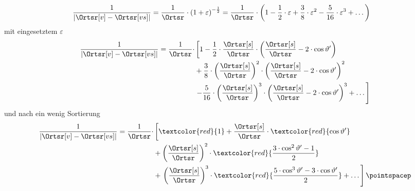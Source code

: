 \begin{frame}

  \begin{align*}
	\dfrac{1}{\left| \Ortsr[v] - \Ortsr[vs] \right|}
		&= \dfrac{1}{\Ortsr} \cdot \left( 1 + \varepsilon \right)^{-\frac{1}{2}} = \dfrac{1}{\Ortsr} \cdot \left( 1 - \dfrac{1}{2} \cdot \varepsilon + \dfrac{3}{8} \cdot \varepsilon^2 - \dfrac{5}{16} \cdot \varepsilon^3 + \dots \right)
\end{align*}
mit eingesetztem \(\varepsilon\)
\begin{equation*}
	\begin{split}
		\dfrac{1}{\left| \Ortsr[v] - \Ortsr[vs] \right|}
			= \dfrac{1}{\Ortsr} \cdot &\left[ 1
			- \dfrac{1}{2} \cdot \dfrac{\Ortsr[s]}{\Ortsr} \cdot \left( \dfrac{\Ortsr[s]}{\Ortsr} - 2 \cdot \cos \vartheta' \right) \right. \\
			&+ \dfrac{3}{8} \cdot \left( \dfrac{\Ortsr[s]}{\Ortsr} \right)^2 \cdot \left( \dfrac{\Ortsr[s]}{\Ortsr} - 2 \cdot \cos \vartheta' \right)^2 \\
			&\left. - \dfrac{5}{16} \cdot \left( \dfrac{\Ortsr[s]}{\Ortsr} \right)^3 \cdot \left( \dfrac{\Ortsr[s]}{\Ortsr} - 2 \cdot \cos \vartheta' \right)^3  + \dots \right]
	\end{split}
\end{equation*}
und nach ein wenig Sortierung
\begin{align*}
	\begin{split}
		\dfrac{1}{\left| \Ortsr[v] - \Ortsr[vs] \right|}
			= \dfrac{1}{\Ortsr} \cdot &\left[ \textcolor{red}{1}
			+ \dfrac{\Ortsr[s]}{\Ortsr} \cdot \textcolor{red}{\cos \vartheta'} \right. \\
			&+ \left(\dfrac{\Ortsr[s]}{\Ortsr}\right)^2 \cdot \textcolor{red}{\dfrac{3 \cdot \cos^2 \vartheta' - 1}{2}} \\
			&+ \left. \left(\dfrac{\Ortsr[s]}{\Ortsr}\right)^3 \cdot \textcolor{red}{\dfrac{5 \cdot \cos^3 \vartheta' - 3 \cdot \cos \vartheta'}{2}}  + \dots \right] \pointspacep
	\end{split}
\end{align*}
\end{frame}
